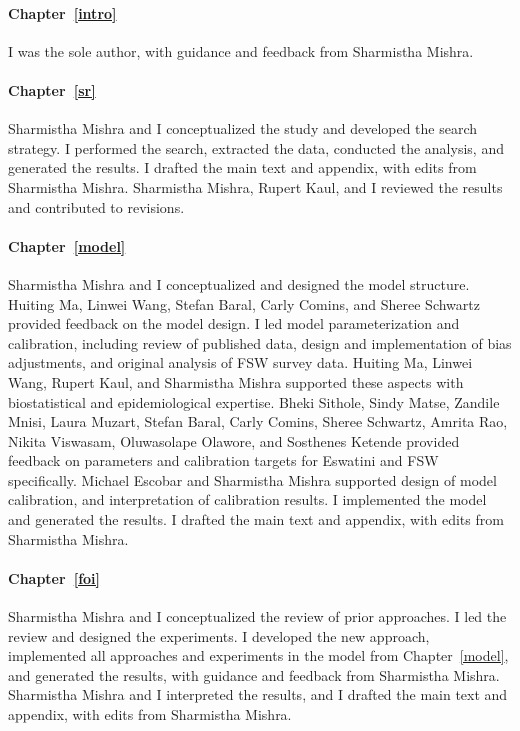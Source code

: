 \paragraph{Chapter~\ref{intro}}
I was the sole author, with guidance and feedback from Sharmistha Mishra.
\paragraph{Chapter~\ref{sr}}
Sharmistha Mishra and I conceptualized the study and developed the search strategy.
I performed the search, extracted the data, conducted the analysis, and generated the results.
I drafted the main text and appendix, with edits from Sharmistha Mishra.
Sharmistha Mishra, Rupert Kaul, and I reviewed the results and contributed to revisions.
\paragraph{Chapter~\ref{model}}
Sharmistha Mishra and I conceptualized and designed the model structure.
Huiting Ma, Linwei Wang, Stefan Baral, Carly Comins, and Sheree Schwartz provided feedback on the model design.
I led model parameterization and calibration, including
review of published data, design and implementation of bias adjustments, and original analysis of FSW survey data.
Huiting Ma, Linwei Wang, Rupert Kaul, and Sharmistha Mishra supported these aspects
with biostatistical and epidemiological expertise.
Bheki Sithole, Sindy Matse, Zandile Mnisi, Laura Muzart,
Stefan Baral, Carly Comins, Sheree Schwartz, Amrita Rao, Nikita Viswasam, Oluwasolape Olawore, and Sosthenes Ketende
provided feedback on parameters and calibration targets for Eswatini and FSW specifically.
Michael Escobar and Sharmistha Mishra supported design of model calibration, and interpretation of calibration results.
I implemented the model and generated the results.
I drafted the main text and appendix, with edits from Sharmistha Mishra.
\paragraph{Chapter~\ref{foi}}
Sharmistha Mishra and I conceptualized the review of prior approaches.
I led the review and designed the experiments.
I developed the new approach, implemented all approaches and experiments in the model from Chapter~\ref{model}, and generated the results,
with guidance and feedback from Sharmistha Mishra.
Sharmistha Mishra and I interpreted the results,
and I drafted the main text and appendix, with edits from Sharmistha Mishra.

